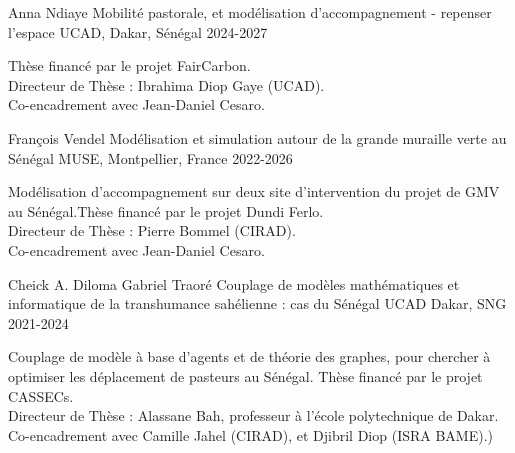 
\vspace{1em}

\begin{cventries}
  \cventry
    {Anna Ndiaye} %
    {Mobilité pastorale, et modélisation d'accompagnement - repenser l'espace } %
    {UCAD, Dakar, Sénégal} %
    {2024-2027} %
    {
      \begin{cvitems} %
        Thèse financé par le projet FairCarbon.\\
        Directeur de Thèse : Ibrahima Diop Gaye (UCAD).\\
        Co-encadrement avec Jean-Daniel Cesaro.
      \end{cvitems}
  }
  \cventry
  {François Vendel} %
  {Modélisation et simulation autour de la grande muraille verte au Sénégal} %
  {MUSE, Montpellier, France} %
  {2022-2026} %
  {
    \begin{cvitems} %
      Modélisation d'accompagnement sur deux site d'intervention du projet de GMV au Sénégal.Thèse financé par le projet Dundi Ferlo.\\
      Directeur de Thèse : Pierre Bommel (CIRAD).\\
      Co-encadrement avec Jean-Daniel Cesaro.
    \end{cvitems}
  }
  \cventry
  {Cheick A. Diloma Gabriel Traoré} %
  {Couplage de modèles mathématiques et informatique de la transhumance sahélienne : cas du Sénégal} %
  {UCAD Dakar, SNG} %
  {2021-2024} %
  {
    \begin{cvitems} %
      Couplage de modèle à base d'agents et de théorie des graphes, pour chercher à optimiser les déplacement de pasteurs au Sénégal. Thèse financé par le projet CASSECs.\\
      Directeur de Thèse : Alassane Bah, professeur à l'école polytechnique de Dakar.\\
      Co-encadrement avec Camille Jahel (CIRAD), et Djibril Diop (ISRA BAME).)
    \end{cvitems}
  }


\end{cventries}
